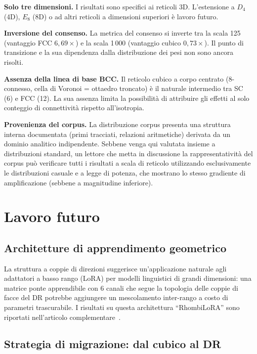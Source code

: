 \documentclass[11pt]{article}
\begin{document}
\textbf{Solo tre dimensioni.} I risultati sono specifici ai reticoli
3D. L'estensione a $D_4$ (4D), $E_8$ (8D) o ad altri reticoli a
dimensioni superiori \`e lavoro futuro.

\textbf{Inversione del consenso.} La metrica del consenso si inverte
tra la scala 125 (vantaggio FCC $6{,}69\times$) e la scala 1\,000
(vantaggio cubico $0{,}73\times$). Il punto di transizione e la sua
dipendenza dalla distribuzione dei pesi non sono ancora risolti.

\textbf{Assenza della linea di base BCC.} Il reticolo cubico a corpo
centrato (8-connesso, cella di Voronoi = ottaedro troncato) \`e il
naturale intermedio tra SC (6) e FCC (12). La sua assenza limita la
possibilit\`a di attribuire gli effetti al solo conteggio di
connettivit\`a rispetto all'isotropia.

\textbf{Provenienza del corpus.} La distribuzione corpus presenta una
struttura interna documentata (primi tracciati, relazioni aritmetiche)
derivata da un dominio analitico indipendente. Sebbene venga qui
valutata insieme a distribuzioni standard, un lettore che metta in
discussione la rappresentativit\`a del corpus pu\`o verificare tutti
i risultati a scala di reticolo utilizzando esclusivamente le
distribuzioni casuale e a legge di potenza, che mostrano lo stesso
gradiente di amplificazione (sebbene a magnitudine inferiore).

\section{Lavoro futuro}
\label{sec:future}

\subsection{Architetture di apprendimento geometrico}

La struttura a coppie di direzioni suggerisce un'applicazione naturale
agli adattatori a basso rango (LoRA) per modelli linguistici di grandi
dimensioni: una matrice ponte apprendibile con 6 canali che segue la
topologia delle coppie di facce del DR potrebbe aggiungere un
mescolamento inter-rango a costo di parametri trascurabile. I risultati
su questa architettura ``RhombiLoRA'' sono riportati nell'articolo
complementare~\cite{bielec2026bridge}.

\subsection{Strategia di migrazione: dal cubico al DR}
\label{sec:migration}
\end{document}
